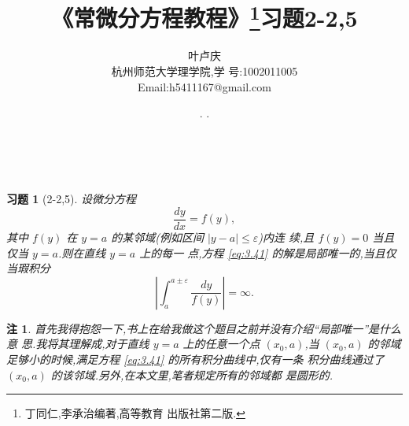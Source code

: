 \documentclass[a4paper, 12pt]{article} %
\makeatletter
\newtheorem*{cdtheorem}{习题}
\newenvironment{exercise}
{\bigskip\begin{mdframed}[backgroundcolor=gray!40,rightline=false,leftline=false,topline=false,bottomline=false]\begin{cdtheorem}}
    {\end{cdtheorem}\end{mdframed}\bigskip}
\newtheorem{ddtheorem}{注}
\newenvironment{remark}
{\bigskip\begin{mdframed}[backgroundcolor=gray!40,rightline=false,leftline=false,topline=false,bottomline=false]\begin{ddtheorem}}
    {\end{ddtheorem}\end{mdframed}\bigskip}
\renewcommand{\maketitle}{ %
  \renewcommand\refname{参考文献}
  \newcommand{\D}{\displaystyle}\newcommand{\ri}{\Rightarrow}
  \newcommand{\ds}{\displaystyle} \renewcommand{\ni}{\noindent}
  \newcommand{\pa}{\partial} \newcommand{\Om}{\Omega}
  \newcommand{\om}{\omega} \newcommand{\sik}{\sum_{i=1}^k}
  \newcommand{\vov}{\Vert\omega\Vert} \newcommand{\Umy}{U_{\mu_i,y^i}}
  \newcommand{\lamns}{\lambda_n^{^{\scriptstyle\sigma}}}
  \newcommand{\chiomn}{\chi_{_{\Omega_n}}}
  \newcommand{\ullim}{\underline{\lim}} \newcommand{\bsy}{\boldsymbol}
  \newcommand{\mvb}{\mathversion{bold}} \newcommand{\la}{\lambda}
  \newcommand{\La}{\Lambda} \newcommand{\va}{\varepsilon}
  \newcommand{\be}{\beta} \newcommand{\al}{\alpha}
  \newcommand{\dis}{\displaystyle} \newcommand{\R}{{\mathbb R}}
  \newcommand{\N}{{\mathbb N}} \newcommand{\cF}{{\mathcal F}}
  \newcommand{\gB}{{\mathfrak B}} \newcommand{\eps}{\epsilon}
  \begin{flushright} %
    {\LARGE\@title} %

    \vspace{50pt} %

    {\large\@author} %
    \\\@date %

    \vspace{40pt} %
  \end{flushright}
}
\makeatother
\begin{document}
\title{\textbf{《常微分方程教程》\footnote{丁同仁,李承治编著,高等教育
      出版社第二版.}习题2-2,5}}

\author{\small{叶卢庆}\\{\small{杭州师范大学理学院,学
      号:1002011005}}\\{\small{Email:h5411167@gmail.com}}} %
\renewcommand{\today}{\number\year. \number\month. \number\day}
\date{\today} %

\maketitle
\begin{exercise}[2-2,5]
  设微分方程
  \begin{equation}
    \label{eq:3.41}
    \frac{dy}{dx}=f(y),
  \end{equation}
  其中 $f(y)$ 在 $y=a$ 的某邻域(例如区间 $|y-a|\leq\varepsilon$)内连
  续,且 $f(y)=0$ 当且仅当 $y=a$.则在直线 $y=a$ 上的每一
  点,方程 \eqref{eq:3.41} 的解是局部唯一的,当且仅当瑕积分
$$
|\int_a^{a\pm \varepsilon}\frac{dy}{f(y)}|=\infty.
$$
\end{exercise}
\begin{remark}
  首先我得抱怨一下,书上在给我做这个题目之前并没有介绍“局部唯一”是什么意
  思.我将其理解成,对于直线 $y=a$ 上的任意一个点 $(x_0,a)$,当 $(x_0,a)$
  的邻域足够小的时候,满足方程 \eqref{eq:3.41} 的所有积分曲线中,仅有一条
  积分曲线通过了 $(x_0,a)$ 的该邻域.另外,在本文里,笔者规定所有的邻域都
  是圆形的.
\end{remark}
\end{document}
